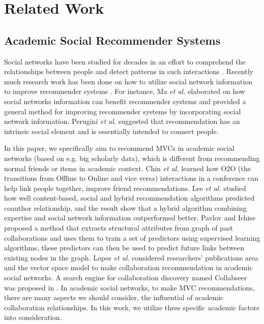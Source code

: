 \documentclass[10pt,journal,compsoc]{IEEEtran}
\begin{document}
\section{Related Work}

\subsection{Academic Social Recommender Systems}
Social networks have been studied for decades in an effort to comprehend the relationships between people and detect patterns in such interactions \cite{Barabasi:linked}. Recently much research work has been done on how to utilize social network information to improve recommender systems \cite{Freyne:Social, He:SNRS}. For instance, Ma \textit{et al.} \cite{Ma:Recommender} elaborated on how social networks information can benefit recommender systems and provided a general method for improving recommender systems by incorporating social network information. Perugini \textit{et al.} \cite{Perugini:Recommender} suggested that recommendation has an intrinsic social element and is essentially intended to connect people.

In this paper, we specifically aim to recommend MVCs in academic social networks (based on e.g. big scholarly data), which is different from recommending normal friends or items in academic context. Chin \textit{et al.} \cite{chin2012linking} learned how O2O (the transitions from Offline to Online and vice versa) interactions in a conference can help link people together, improve friend recommendations. Lee \textit{et al.} \cite{lee2011recommending} studied how well content-based, social and hybrid recommendation algorithms predicted coauthor relationship, and the result show that a hybrid algorithm combining expertise and social network information outperformed better. Pavlov and Ichise \cite{pavlov2007finding} proposed a method that extracts structural attributes from graph of past collaborations and uses them to train a set of predictors using supervised learning algorithms, these predictors can then be used to predict future links between existing nodes in the graph. Lopes \textit{et al.} \cite{Lopes:Colleboration} considered researchers' publications area and the vector space model to make collaboration recommendation in academic social networks. A search engine for collaboration discovery named Collabseer was proposed in \cite{Chen:CollabSeer}. In academic social networks, to make MVC recommendations, there are many aspects we should consider, the influential of academic collaboration relationships. In this work, we utilize three specific academic factors into consideration.
\end{document}

